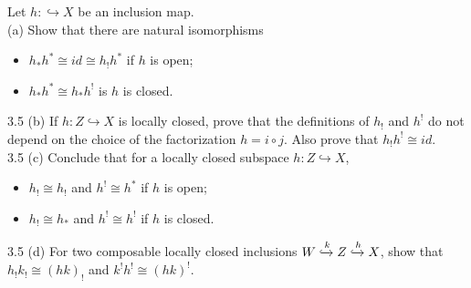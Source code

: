  Let $h: \hookrightarrow X$ be an inclusion map.\\ 
(a) Show that there are natural isomorphisms 
\begin{itemize}
	\item $h_*h^* \cong id \cong h_!h^*$ if $h$ is open;
	\item $h_*h^* \cong h_*h^!$ is $h$ is closed.
\end{itemize}
3.5 (b) If $h: Z \hookrightarrow X$ is locally closed, prove that the definitions of $h_!$ and $h^!$ do not depend on the choice of the factorization $h= i \circ j$. Also prove that $h_!h^! \cong id$.\\
3.5 (c) Conclude that for a locally closed subspace $h: Z \hookrightarrow X$, 
\begin{itemize}
	\item $h_! \cong h_!$ and $h^! \cong h^*$ if $h$ is open;
	\item $h_! \cong h_*$ and $h^! \cong h^!$ if $h$ is closed. 
\end{itemize}
3.5 (d) For two composable locally closed inclusions $W \xhookrightarrow{k} Z \xhookrightarrow{h} X$, show that $h_!k_! \cong (hk)_!$ and $k^!h^! \cong (hk)^!$.
